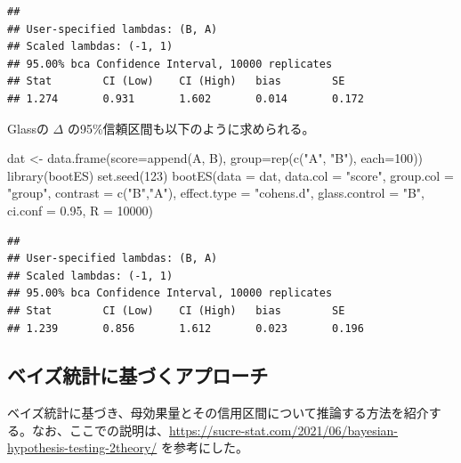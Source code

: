 \documentclass[
  ja=standard, xelatex, base=12pt]{bxjsreport}
\newenvironment{Shaded}{\begin{snugshade}}{\end{snugshade}}
\newcommand{\AttributeTok}[1]{\textcolor[rgb]{0.77,0.63,0.00}{#1}}
\newcommand{\DecValTok}[1]{\textcolor[rgb]{0.00,0.00,0.81}{#1}}
\newcommand{\FloatTok}[1]{\textcolor[rgb]{0.00,0.00,0.81}{#1}}
\newcommand{\FunctionTok}[1]{\textcolor[rgb]{0.00,0.00,0.00}{#1}}
\newcommand{\NormalTok}[1]{#1}
\newcommand{\OtherTok}[1]{\textcolor[rgb]{0.56,0.35,0.01}{#1}}
\newcommand{\StringTok}[1]{\textcolor[rgb]{0.31,0.60,0.02}{#1}}
\begin{document}
\begin{verbatim}
## 
## User-specified lambdas: (B, A)
## Scaled lambdas: (-1, 1)
## 95.00% bca Confidence Interval, 10000 replicates
## Stat        CI (Low)    CI (High)   bias        SE          
## 1.274       0.931       1.602       0.014       0.172
\end{verbatim}

Glassの \(\Delta\) の95\%信頼区間も以下のように求められる。

\begin{Shaded}
\begin{Highlighting}[]
\NormalTok{dat }\OtherTok{\textless{}{-}} \FunctionTok{data.frame}\NormalTok{(}\AttributeTok{score=}\FunctionTok{append}\NormalTok{(A, B), }\AttributeTok{group=}\FunctionTok{rep}\NormalTok{(}\FunctionTok{c}\NormalTok{(}\StringTok{"A"}\NormalTok{, }\StringTok{"B"}\NormalTok{), }\AttributeTok{each=}\DecValTok{100}\NormalTok{))}
\FunctionTok{library}\NormalTok{(bootES)}
\FunctionTok{set.seed}\NormalTok{(}\DecValTok{123}\NormalTok{)}
\FunctionTok{bootES}\NormalTok{(}\AttributeTok{data =}\NormalTok{ dat, }\AttributeTok{data.col =} \StringTok{"score"}\NormalTok{, }\AttributeTok{group.col =} \StringTok{"group"}\NormalTok{, }\AttributeTok{contrast =} \FunctionTok{c}\NormalTok{(}\StringTok{"B"}\NormalTok{,}\StringTok{"A"}\NormalTok{), }
       \AttributeTok{effect.type =} \StringTok{"cohens.d"}\NormalTok{, }\AttributeTok{glass.control =} \StringTok{"B"}\NormalTok{, }\AttributeTok{ci.conf =} \FloatTok{0.95}\NormalTok{, }\AttributeTok{R =} \DecValTok{10000}\NormalTok{)}
\end{Highlighting}
\end{Shaded}

\begin{verbatim}
## 
## User-specified lambdas: (B, A)
## Scaled lambdas: (-1, 1)
## 95.00% bca Confidence Interval, 10000 replicates
## Stat        CI (Low)    CI (High)   bias        SE          
## 1.239       0.856       1.612       0.023       0.196
\end{verbatim}

\hypertarget{ux30d9ux30a4ux30baux7d71ux8a08ux306bux57faux3065ux304fux30a2ux30d7ux30edux30fcux30c1-1}{%
\subsection{ベイズ統計に基づくアプローチ}\label{ux30d9ux30a4ux30baux7d71ux8a08ux306bux57faux3065ux304fux30a2ux30d7ux30edux30fcux30c1-1}}

ベイズ統計に基づき、母効果量とその信用区間について推論する方法を紹介する。なお、ここでの説明は、\url{https://sucre-stat.com/2021/06/bayesian-hypothesis-testing-2theory/} を参考にした。
\end{document}
